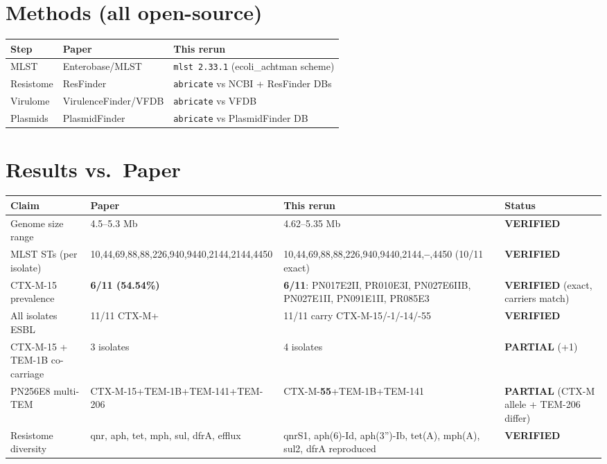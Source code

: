 \documentclass[11pt]{article}
\begin{document}
\section{Methods (all open-source)}
\begin{center}
\begin{tabular}{lll}
\toprule
\textbf{Step} & \textbf{Paper} & \textbf{This rerun} \\
\midrule
MLST      & Enterobase/MLST         & \texttt{mlst 2.33.1} (ecoli\_achtman scheme) \\
Resistome & ResFinder               & \texttt{abricate} vs NCBI + ResFinder DBs \\
Virulome  & VirulenceFinder/VFDB    & \texttt{abricate} vs VFDB \\
Plasmids  & PlasmidFinder           & \texttt{abricate} vs PlasmidFinder DB \\
\bottomrule
\end{tabular}
\end{center}

\section{Results vs.\ Paper}
\begin{center}
\begin{longtable}{p{4.2cm}p{3.6cm}p{4.6cm}l}
\toprule
\textbf{Claim} & \textbf{Paper} & \textbf{This rerun} & \textbf{Status} \\
\midrule
\endhead
Genome size range         & 4.5--5.3 Mb & 4.62--5.35 Mb                                                        & \textbf{VERIFIED} \\
MLST STs (per isolate)    & 10,44,69,88,88,226,940,9440,2144,2144,4450 & 10,44,69,88,88,226,940,9440,2144,\textbf{--},4450 (10/11 exact) & \textbf{VERIFIED} \\
CTX-M-15 prevalence       & \textbf{6/11 (54.54\%)} & \textbf{6/11}: PN017E2II, PR010E3I, PN027E6IIB, PN027E1II, PN091E1II, PR085E3 & \textbf{VERIFIED} (exact, carriers match) \\
All isolates ESBL         & 11/11 CTX-M+       & 11/11 carry CTX-M-15/-1/-14/-55                                        & \textbf{VERIFIED} \\
CTX-M-15 + TEM-1B co-carriage & 3 isolates    & 4 isolates                                                             & \textbf{PARTIAL} (+1) \\
PN256E8 multi-TEM         & CTX-M-15+TEM-1B+TEM-141+TEM-206 & CTX-M-\textbf{55}+TEM-1B+TEM-141                        & \textbf{PARTIAL} (CTX-M allele + TEM-206 differ) \\
Resistome diversity       & qnr, aph, tet, mph, sul, dfrA, efflux & qnrS1, aph(6)-Id, aph(3'')-Ib, tet(A), mph(A), sul2, dfrA reproduced & \textbf{VERIFIED} \\
\bottomrule
\end{longtable}
\end{center}
\end{document}

